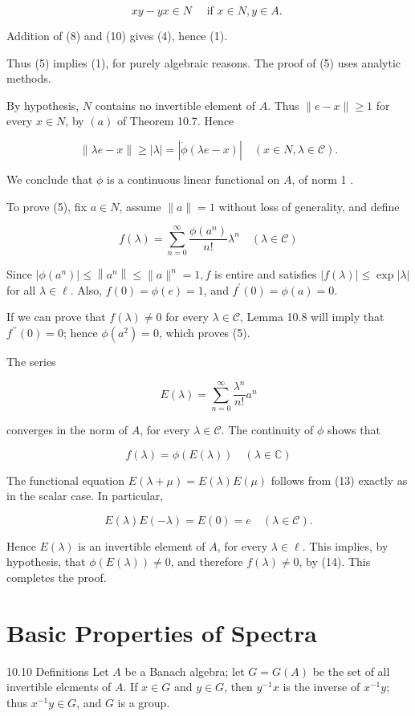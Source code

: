 \documentclass[10pt]{article}
\begin{document}
$$
x y-y x \in N \quad \text { if } x \in N, y \in A \text {. }
$$

Addition of (8) and (10) gives (4), hence (1).

Thus (5) implies (1), for purely algebraic reasons. The proof of (5) uses analytic methods.

By hypothesis, $N$ contains no invertible element of $A$. Thus $\|e-x\| \geq 1$ for every $x \in N$, by $(a)$ of Theorem 10.7. Hence

$$
\|\lambda e-x\| \geq|\lambda|=|\dot{\phi}(\lambda e-x)| \quad(x \in N, \lambda \in \mathscr{C}) .
$$

We conclude that $\phi$ is a continuous linear functional on $A$, of norm 1 .

To prove (5), fix $a \in N$, assume $\|a\|=1$ without loss of generality, and define

$$
f(\lambda)=\sum_{n=0}^{\infty} \frac{\phi\left(a^{n}\right)}{n !} \lambda^{n} \quad(\lambda \in \mathscr{C})
$$

Since $\left|\phi\left(a^{n}\right)\right| \leq\left\|a^{n}\right\| \leq\|a\|^{n}=1, f$ is entire and satisfies $|f(\lambda)| \leq \exp |\lambda|$ for all $\lambda \in \ell$. Also, $f(0)=\phi(e)=1$, and $f^{\prime}(0)=\phi(a)=0$.

If we can prove that $f(\lambda) \neq 0$ for every $\lambda \in \mathscr{C}$, Lemma 10.8 will imply that $f^{\prime \prime}(0)=0$; hence $\phi\left(a^{2}\right)=0$, which proves (5).

The series

$$
E(\lambda)=\sum_{n=0}^{\infty} \frac{\lambda^{n}}{n !} a^{n}
$$

converges in the norm of $A$, for every $\lambda \in \mathscr{C}$. The continuity of $\phi$ shows that

$$
f(\lambda)=\phi(E(\lambda)) \quad(\lambda \in \mathbb{C})
$$

The functional equation $E(\lambda+\mu)=E(\lambda) E(\mu)$ follows from (13) exactly as in the scalar case. In particular,

$$
E(\lambda) E(-\lambda)=E(0)=e \quad(\lambda \in \mathscr{C}) .
$$

Hence $E(\lambda)$ is an invertible element of $A$, for every $\lambda \in \ell$. This implies, by hypothesis, that $\phi(E(\lambda)) \neq 0$, and therefore $f(\lambda) \neq 0$, by (14). This completes the proof.

\section{Basic Properties of Spectra}
10.10 Definitions Let $A$ be a Banach algebra; let $G=G(A)$ be the set of all invertible elcments of $A$. If $x \in G$ and $y \in G$, then $y^{-1} x$ is the inverse of $x^{-1} y$; thus $x^{-1} y \in G$, and $G$ is a group.
\end{document}
